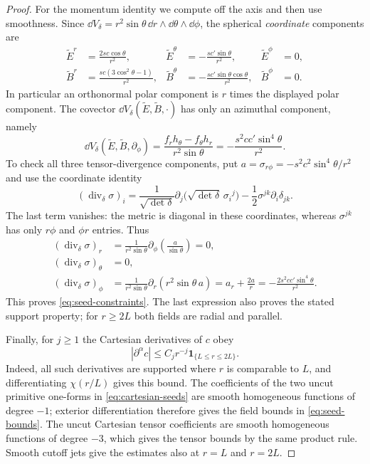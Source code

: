 \begin{proof}
For the momentum identity we compute off the axis and then use smoothness.
Since $\dd V_\delta=r^2\sin\theta\,\dd r\wedge\dd\theta\wedge\dd\phi$,
the spherical \emph{coordinate} components are
\begin{equation}
\label{eq:field-components}
\begin{aligned}
 \widetilde E^r&=\frac{2sc\cos\theta}{r^2},&
 \widetilde E^\theta&=-\frac{sc'\sin\theta}{r^2},&
 \widetilde E^\phi&=0,\\
 \widetilde B^r&=\frac{sc(3\cos^2\theta-1)}{r^2},&
 \widetilde B^\theta&=-\frac{sc'\sin\theta\cos\theta}{r^2},&
 \widetilde B^\phi&=0.
\end{aligned}
\end{equation}
In particular an orthonormal polar component is $r$ times the displayed
polar component.  The covector $\dd V_\delta(\widetilde E,\widetilde B,\cdot)$
has only an azimuthal component, namely
\begin{equation}
\label{eq:seed-cross-product}
 \dd V_\delta(\widetilde E,\widetilde B,\partial_\phi)
 =\frac{f_rh_\theta-f_\theta h_r}{r^2\sin\theta}
 =-\frac{s^2cc'\sin^4\theta}{r^2}.
\end{equation}
To check all three tensor-divergence components, put
$a=\sigma_{r\phi}=-s^2c^2\sin^4\theta/r^2$ and use the coordinate identity
\[
 (\operatorname{div}_\delta\sigma)_i
 =\frac1{\sqrt{\det\delta}}\partial_j
    \bigl(\sqrt{\det\delta}\,\sigma_i{}^j\bigr)
   -\frac12\sigma^{jk}\partial_i\delta_{jk}.
\]
The last term vanishes: the metric is diagonal in these coordinates,
whereas $\sigma^{jk}$ has only $r\phi$ and $\phi r$ entries.  Thus
\begin{equation}
\label{eq:all-divergence-components}
\begin{aligned}
 (\operatorname{div}_\delta\sigma)_r
  &=\frac1{r^2\sin\theta}\partial_\phi
       \left(\frac a{\sin\theta}\right)=0,\\
 (\operatorname{div}_\delta\sigma)_\theta&=0,\\
 (\operatorname{div}_\delta\sigma)_\phi
  &=\frac1{r^2\sin\theta}\partial_r(r^2\sin\theta\,a)
    =a_r+\frac{2a}{r}
    =-\frac{2s^2cc'\sin^4\theta}{r^2}.
\end{aligned}
\end{equation}
This proves \eqref{eq:seed-constraints}.  The last expression also proves
the stated support property; for $r\ge2L$ both fields are radial and
parallel.

Finally, for $j\ge1$ the Cartesian derivatives of $c$ obey
\[
 |\partial^\alpha c|\le C_j r^{-j}
   \mathbf1_{\{L\le r\le2L\}}.
\]
Indeed, all such derivatives are supported where $r$ is comparable to
$L$, and differentiating $\chi(r/L)$ gives this bound.  The coefficients
of the two uncut primitive one-forms in \eqref{eq:cartesian-seeds} are
smooth homogeneous functions of degree $-1$; exterior differentiation
therefore gives the field bounds in \eqref{eq:seed-bounds}.  The uncut
Cartesian tensor coefficients are smooth homogeneous functions of degree
$-3$, which gives the tensor bounds by the same product rule.  Smooth
cutoff jets give the estimates also at $r=L$ and $r=2L$.
\end{proof}


